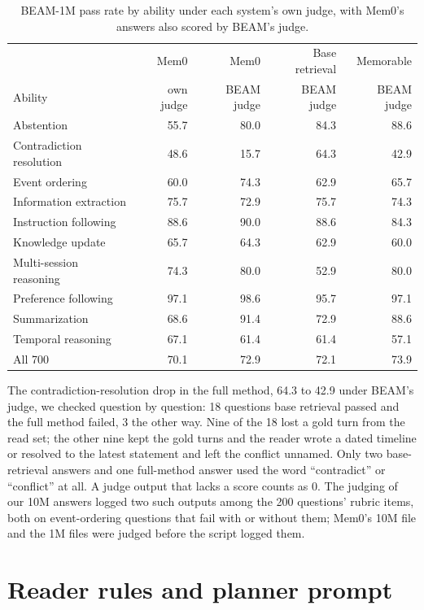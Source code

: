 \begin{table}[H]
\caption{BEAM-1M pass rate by ability under each system's own judge, with Mem0's answers also scored by BEAM's judge.}
\label{tab:ownjudge}
\small
\centering
\setlength{\tabcolsep}{6pt}
\begin{tabular}{@{}lrrrr@{}}
\toprule
 & Mem0 & Mem0 & Base retrieval & Memorable \\
Ability & own judge & BEAM judge & BEAM judge & BEAM judge \\
\midrule
Abstention & 55.7 & 80.0 & 84.3 & 88.6 \\
Contradiction resolution & 48.6 & 15.7 & 64.3 & 42.9 \\
Event ordering & 60.0 & 74.3 & 62.9 & 65.7 \\
Information extraction & 75.7 & 72.9 & 75.7 & 74.3 \\
Instruction following & 88.6 & 90.0 & 88.6 & 84.3 \\
Knowledge update & 65.7 & 64.3 & 62.9 & 60.0 \\
Multi-session reasoning & 74.3 & 80.0 & 52.9 & 80.0 \\
Preference following & 97.1 & 98.6 & 95.7 & 97.1 \\
Summarization & 68.6 & 91.4 & 72.9 & 88.6 \\
Temporal reasoning & 67.1 & 61.4 & 61.4 & 57.1 \\
\midrule
All 700 & 70.1 & 72.9 & 72.1 & 73.9 \\
\bottomrule
\end{tabular}
\end{table}

The contradiction-resolution drop in the full method, 64.3 to 42.9 under BEAM's judge, we checked question by question: 18 questions base retrieval passed and the full method failed, 3 the other way. Nine of the 18 lost a gold turn from the read set; the other nine kept the gold turns and the reader wrote a dated timeline or resolved to the latest statement and left the conflict unnamed. Only two base-retrieval answers and one full-method answer used the word ``contradict'' or ``conflict'' at all. A judge output that lacks a score counts as 0. The judging of our 10M answers logged two such outputs among the 200 questions' rubric items, both on event-ordering questions that fail with or without them; Mem0's 10M file and the 1M files were judged before the script logged them.

\section{Reader rules and planner prompt}
\label{app:rules}

